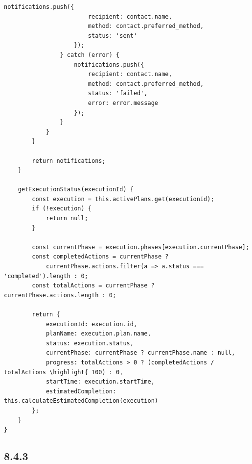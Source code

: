 \begin{lstlisting}[style=javascript]
                    notifications.push({
                        recipient: contact.name,
                        method: contact.preferred_method,
                        status: 'sent'
                    });
                } catch (error) {
                    notifications.push({
                        recipient: contact.name,
                        method: contact.preferred_method,
                        status: 'failed',
                        error: error.message
                    });
                }
            }
        }
        
        return notifications;
    }
    
    getExecutionStatus(executionId) {
        const execution = this.activePlans.get(executionId);
        if (!execution) {
            return null;
        }
        
        const currentPhase = execution.phases[execution.currentPhase];
        const completedActions = currentPhase ? 
            currentPhase.actions.filter(a => a.status === 'completed').length : 0;
        const totalActions = currentPhase ? currentPhase.actions.length : 0;
        
        return {
            executionId: execution.id,
            planName: execution.plan.name,
            status: execution.status,
            currentPhase: currentPhase ? currentPhase.name : null,
            progress: totalActions > 0 ? (completedActions / totalActions \highlight{ 100) : 0,
            startTime: execution.startTime,
            estimatedCompletion: this.calculateEstimatedCompletion(execution)
        };
    }
}
\end{lstlisting}

\hypertarget{section-109}{%
\subsection{8.4.3}\label{section-109}}

\hypertarget{section-110}{%
\subsubsection{}\label{section-110}}

